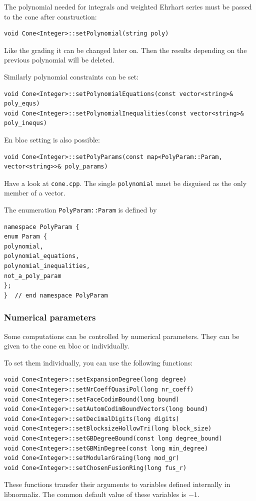 \begin{small}
The polynomial needed for integrals and weighted Ehrhart series must be passed to the cone after construction:
\begin{Verbatim}
void Cone<Integer>::setPolynomial(string poly)
\end{Verbatim}

Like the grading it can be changed later on. Then the results depending on the previous polynomial will be deleted.

Similarly polynomial constraints can be set:
\begin{Verbatim}
void Cone<Integer>::setPolynomialEquations(const vector<string>& poly_equs)
void Cone<Integer>::setPolynomialInequalities(const vector<string>& poly_inequs)
\end{Verbatim}

En bloc setting is also possible:
\begin{Verbatim}
void Cone<Integer>::setPolyParams(const map<PolyParam::Param, vector<string>>& poly_params)
\end{Verbatim}
Have a look at \verb|cone.cpp|. The single \verb|polynomial| must be disguised as the only member of a vector.

The enumeration \verb*|PolyParam::Param| is defined by
\begin{Verbatim}
namespace PolyParam {
enum Param {
polynomial,
polynomial_equations,
polynomial_inequalities,
not_a_poly_param
};
}  // end namespace PolyParam
\end{Verbatim}

\subsubsection{Numerical parameters}\label{num_params}

Some computations can be controlled by numerical parameters. They can be given to the cone en bloc or individually.

To set them individually, you can use the following functions:
\begin{Verbatim}
void Cone<Integer>::setExpansionDegree(long degree)
void Cone<Integer>::setNrCoeffQuasiPol(long nr_coeff)
void Cone<Integer>::setFaceCodimBound(long bound)
void Cone<Integer>::setAutomCodimBoundVectors(long bound)
void Cone<Integer>::setDecimalDigits(long digits)
void Cone<Integer>::setBlocksizeHollowTri(long block_size)
void Cone<Integer>::setGBDegreeBound(const long degree_bound)
void Cone<Integer>::setGBMinDegree(const long min_degree)
void Cone<Integer>::setModularGraing(long mod_gr)
void Cone<Integer>::setChosenFusionRing(long fus_r)
\end{Verbatim}
These functions transfer their arguments to variables defined internally in libnormaliz. The common default value of these variables is $-1$.


\end{small}
